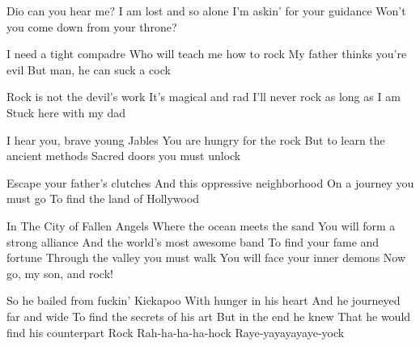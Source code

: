     \beginverse\replay[verse]
        Dio can you hear me?
        I am lost and so alone
        I'm askin' for your guidance
        Won't you come down from your throne?

        I need a tight compadre
        Who will teach me how to rock
        My father thinks you're evil
        But man, he can suck a cock

        Rock is not the devil's work
        It's magical and rad
        I'll never rock as long as I am
        Stuck here with my dad
    \endverse

    \beginverse\replay[verse]
        I hear you, brave young Jables
        You are hungry for the rock
        But to learn the ancient methods
        Sacred doors you must unlock

        Escape your father's clutches
        And this oppressive neighborhood
        On a journey you must go
        To find the land of Hollywood
    \endverse

    \beginverse\replay[verse]
        In The City of Fallen Angels
        Where the ocean meets the sand
        You will form a strong alliance
        And the world's most awesome band
        To find your fame and fortune
        Through the valley you must walk
        You will face your inner demons
        Now go, my son, and rock!
    \endverse

    \beginverse\replay[verse]
        So he bailed from fuckin' Kickapoo
        With hunger in his heart
        And he journeyed far and wide
        To find the secrets of his art
        But in the end he knew
        That he would find his counterpart
        Rock
        Rah-ha-ha-ha-hock
        Raye-yayayayaye-yock
    \endverse
\endsong
